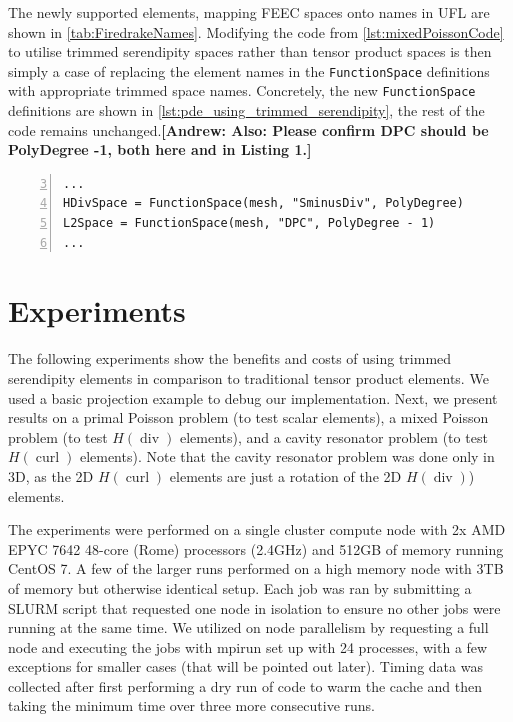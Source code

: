 \documentclass[format=acmsmall,screen,timestamp=false,a4paper]{acmart}
\DeclareMathOperator{\Div}{div}
\DeclareMathOperator{\curl}{curl}
\newcommand\akg[1]{\textbf{\textcolor[rgb]{.5,0,1}{[Andrew: #1]}}}
\newcommand\josh[1]{\textbf{\textcolor[rgb]{0,.5,1}{[Josh: #1]}}}
\newcommand\lm[1]{\textbf{\textcolor[rgb]{1,0,0.5}{[Lawrence: #1]}}}
\newcommand{\hcurl}{\ensuremath{{H}(\curl)}\xspace}
\newcommand{\hdiv}{\ensuremath{{H}(\Div)}\xspace}
\begin{document}
The newly supported elements, mapping FEEC spaces onto names in UFL are shown in \cref{tab:FiredrakeNames}. Modifying the code from \cref{lst:mixedPoissonCode} to utilise trimmed serendipity spaces rather than tensor product spaces is then simply a case of replacing the element names in the \texttt{FunctionSpace} definitions with appropriate trimmed space names. Concretely, the new \texttt{FunctionSpace} definitions are shown in \cref{lst:pde_using_trimmed_serendipity}, the rest of the code remains unchanged.\akg{Also: Please confirm DPC should be PolyDegree -1, both here and in Listing 1.}
\begin{lstlisting}[float=htbp,caption={Setting up Firedrake to use the trimmed serendipity elements in a mixed Poisson problem in 3D.}, label={lst:pde_using_trimmed_serendipity}, numbers=left, firstnumber=3, xleftmargin=20pt,  xrightmargin=20pt]
...
HDivSpace = FunctionSpace(mesh, "SminusDiv", PolyDegree)
L2Space = FunctionSpace(mesh, "DPC", PolyDegree - 1)
...
\end{lstlisting}
 


  \section{Experiments}
    
The following experiments show the benefits and costs of using trimmed serendipity elements in comparison to traditional tensor product elements.  We used a basic projection example to debug our implementation.  Next, we present results on a primal Poisson problem (to test scalar elements), a mixed Poisson problem (to test \hdiv elements), and a cavity resonator problem (to test \hcurl elements).  Note that the cavity resonator problem was done only in 3D, as the 2D \hcurl elements are just a rotation of the 2D \hdiv) elements. 

The experiments were performed on a single cluster compute node with 2x AMD EPYC 7642 48-core (Rome) processors (2.4GHz) and 512GB of memory running CentOS 7.  A few of the larger runs performed on a high memory node with 3TB of memory but otherwise identical setup.  Each job was ran by submitting a SLURM script that requested one node in isolation to ensure no other jobs were running at the same time.  We utilized on node parallelism by requesting a full node and executing the jobs with mpirun set up with 24 processes, with a few exceptions for smaller cases (that will be pointed out later).  Timing data was collected after first performing a dry run of code to warm the cache and then taking the minimum time over three more consecutive runs.  
\end{document}
